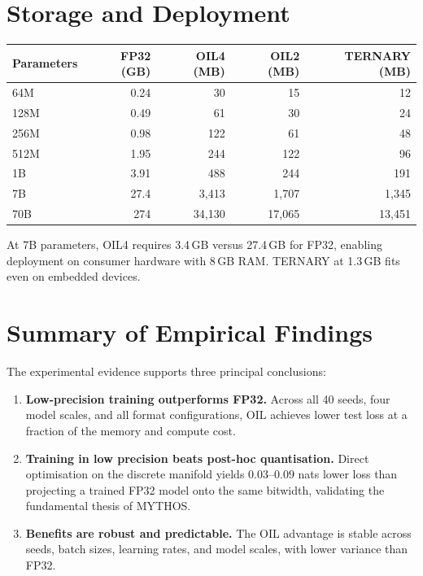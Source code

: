 \section{Storage and Deployment}
\label{sec:storage}
\begin{center}
\begin{tabular}{lrrrr}
\toprule
\textbf{Parameters} & \textbf{FP32 (GB)} & \textbf{OIL4 (MB)} & \textbf{OIL2 (MB)} & \textbf{TERNARY (MB)} \\
\midrule
64M   & 0.24   & 30     & 15     & 12    \\
128M  & 0.49   & 61     & 30     & 24    \\
256M  & 0.98   & 122    & 61     & 48    \\
512M  & 1.95   & 244    & 122    & 96    \\
1B    & 3.91   & 488    & 244    & 191   \\
7B    & 27.4   & 3{,}413 & 1{,}707 & 1{,}345 \\
70B   & 274    & 34{,}130 & 17{,}065 & 13{,}451 \\
\bottomrule
\end{tabular}
\end{center}
\begin{table}[h]
\centering
\caption{Projected storage requirements across model scales.}
\label{tab:storage}
\end{table}
At 7B parameters, OIL4 requires 3.4\,GB versus 27.4\,GB for FP32, enabling deployment on
consumer hardware with 8\,GB RAM. TERNARY at 1.3\,GB fits even on embedded devices.
\section{Summary of Empirical Findings}
\label{sec:summary}
The experimental evidence supports three principal conclusions:
\begin{enumerate}
    \item \textbf{Low-precision training outperforms FP32.} Across all 40 seeds, four model
    scales, and all format configurations, OIL achieves lower test loss at a fraction of the
    memory and compute cost.
    \item \textbf{Training in low precision beats post-hoc quantisation.} Direct optimisation
    on the discrete manifold yields $0.03$--$0.09$ nats lower loss than projecting a trained
    FP32 model onto the same bitwidth, validating the fundamental thesis of MYTHOS.
    \item \textbf{Benefits are robust and predictable.} The OIL advantage is stable across
    seeds, batch sizes, learning rates, and model scales, with lower variance than FP32.
\end{enumerate}